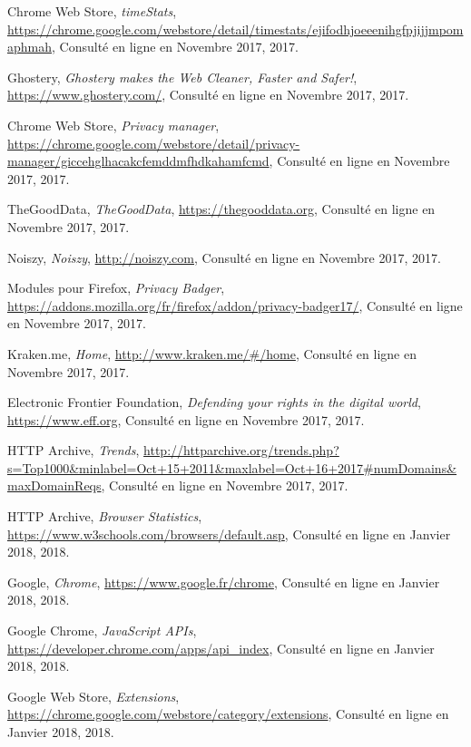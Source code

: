 \begin{thebibliography}{9}
  Chrome Web Store,
  \emph{timeStats},
  \url{https://chrome.google.com/webstore/detail/timestats/ejifodhjoeeenihgfpjijjmpomaphmah},
  Consulté en ligne en Novembre 2017,
  2017.

  Ghostery,
  \emph{Ghostery makes the Web Cleaner, Faster and Safer!},
  \url{https://www.ghostery.com/},
  Consulté en ligne en Novembre 2017,
  2017.

  Chrome Web Store,
  \emph{Privacy manager},
  \url{https://chrome.google.com/webstore/detail/privacy-manager/giccehglhacakcfemddmfhdkahamfcmd},
  Consulté en ligne en Novembre 2017,
  2017.

  TheGoodData,
  \emph{TheGoodData},
  \url{https://thegooddata.org},
  Consulté en ligne en Novembre 2017,
  2017.

  Noiszy,
  \emph{Noiszy},
  \url{http://noiszy.com},
  Consulté en ligne en Novembre 2017,
  2017.

  Modules pour Firefox,
  \emph{Privacy Badger},
  \url{https://addons.mozilla.org/fr/firefox/addon/privacy-badger17/},
  Consulté en ligne en Novembre 2017,
  2017.

  Kraken.me,
  \emph{Home},
  \url{http://www.kraken.me/#/home},
  Consulté en ligne en Novembre 2017,
  2017.

  Electronic Frontier Foundation,
  \emph{Defending your rights in the digital world},
  \url{https://www.eff.org},
  Consulté en ligne en Novembre 2017,
  2017.

  HTTP Archive,
  \emph{Trends},
  \url{http://httparchive.org/trends.php?s=Top1000&minlabel=Oct+15+2011&maxlabel=Oct+16+2017#numDomains&maxDomainReqs},
  Consulté en ligne en Novembre 2017,
  2017.

  HTTP Archive,
  \emph{Browser Statistics},
  \url{https://www.w3schools.com/browsers/default.asp},
  Consulté en ligne en Janvier 2018,
  2018.

  Google,
  \emph{Chrome},
  \url{https://www.google.fr/chrome},
  Consulté en ligne en Janvier 2018,
  2018.

  Google Chrome,
  \emph{JavaScript APIs},
  \url{https://developer.chrome.com/apps/api_index},
  Consulté en ligne en Janvier 2018,
  2018.

  Google Web Store,
  \emph{Extensions},
  \url{https://chrome.google.com/webstore/category/extensions},
  Consulté en ligne en Janvier 2018,
  2018.


\end{thebibliography}
